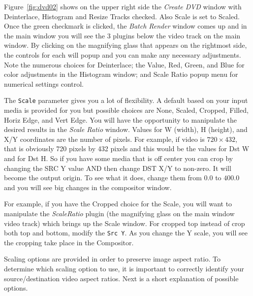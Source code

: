 Figure~\ref{fig:dvd02} shows on the upper right side the \textit{Create DVD} window with Deinterlace, Histogram and Resize Tracks checked.  Also Scale is set to Scaled.  Once the green checkmark is clicked, the \textit{Batch Render} window comes up and in the main window you will see the 3 plugins below the video track on the main window.  By clicking on the magnifying glass that appears on the rightmost side, the controls for each will popup and you can make any necessary adjustments.  Note the numerous choices for Deinterlace; the Value, Red, Green, and Blue for color adjustments in the Histogram window; and Scale Ratio popup menu for numerical settings control.

The \texttt{Scale} parameter gives you a lot of flexibility.  A default based on your input media is provided for you but possible choices are None, Scaled, Cropped, Filled, Horiz Edge, and Vert Edge.  You will have the opportunity to manipulate the desired results in the \textit{Scale Ratio} window.  Values for W (width), H (height), and X/Y coordinates are the number of pixels.  For example, if video is $720\times432$, that is obviously 720 pixels by 432 pixels and this would be the values for Dst W and for Dst H.  So if you have some media that is off center you can crop by changing the SRC Y value AND then change DST X/Y to non-zero. It will become the output origin.  To see what it does, change them from $0.0$ to $400.0$ and you will see big changes in the compositor window.

For example, if you have the Cropped choice for the Scale, you will want to manipulate the \textit{ScaleRatio} plugin (the magnifying glass on the main window video track) which brings up the Scale window.  For cropped top instead of crop both top and bottom, modify the \texttt{Src Y}.   As you change the Y scale, you will see the cropping take place in the Compositor. 

Scaling options are provided in order to preserve image aspect ratio.  To determine which scaling option to use, it is important to correctly identify your source/destination video aspect ratios.  Next is a short explanation of possible options.

